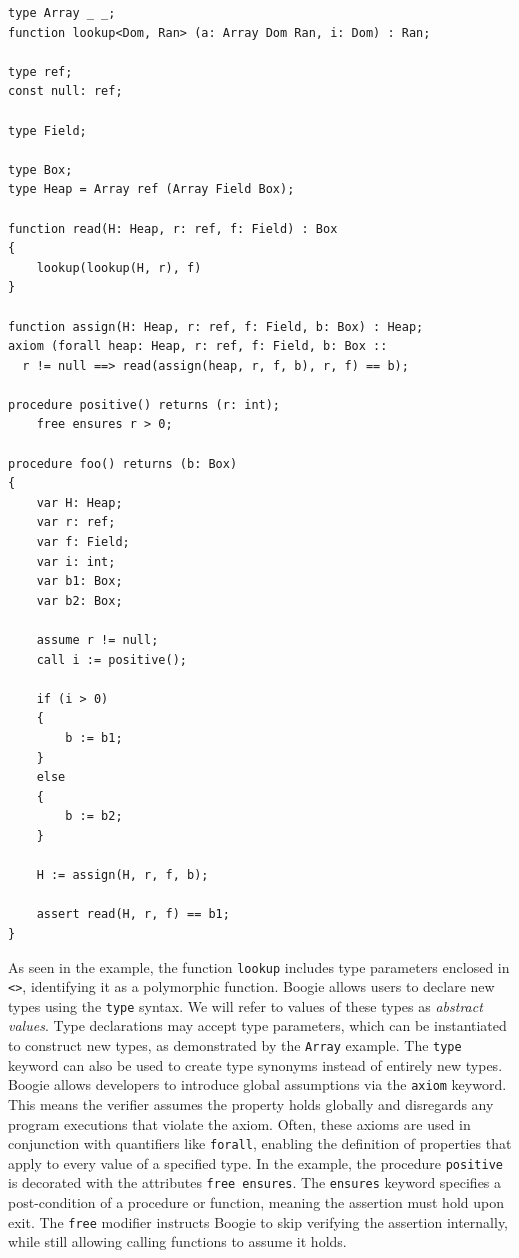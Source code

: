 \begin{lstlisting}[caption={Example Boogie code (inspired by Dafny's encoding)}]
type Array _ _;
function lookup<Dom, Ran> (a: Array Dom Ran, i: Dom) : Ran;

type ref;
const null: ref;

type Field;

type Box;
type Heap = Array ref (Array Field Box);

function read(H: Heap, r: ref, f: Field) : Box
{
    lookup(lookup(H, r), f)
}

function assign(H: Heap, r: ref, f: Field, b: Box) : Heap;
axiom (forall heap: Heap, r: ref, f: Field, b: Box ::
  r != null ==> read(assign(heap, r, f, b), r, f) == b);

procedure positive() returns (r: int);
    free ensures r > 0;

procedure foo() returns (b: Box)
{
    var H: Heap;
    var r: ref;
    var f: Field;
    var i: int;
    var b1: Box;
    var b2: Box;

    assume r != null;
    call i := positive();

    if (i > 0)
    {
        b := b1;
    }
    else
    {
        b := b2;
    }

    H := assign(H, r, f, b);

    assert read(H, r, f) == b1;
}
\end{lstlisting}

As seen in the example, the function \lstinline[columns=fixed]{lookup} includes type parameters enclosed in \lstinline[columns=fixed]{<>},
identifying it as a polymorphic function.
Boogie allows users to declare new types using the \lstinline[columns=fixed]{type} syntax.
We will refer to values of these types as \emph{abstract values}.
Type declarations may accept type parameters,
which can be instantiated to construct new types, as demonstrated by the \lstinline[columns=fixed]{Array} example.
The \lstinline[columns=fixed]{type} keyword can also be used to create type synonyms instead of entirely new types.
Boogie allows developers to introduce global assumptions via the \lstinline[columns=fixed]{axiom} keyword.
This means the verifier assumes the property holds globally and disregards any program executions that violate the axiom.
Often, these axioms are used in conjunction with quantifiers like \lstinline[columns=fixed]{forall}, 
enabling the definition of properties that apply to every value of a specified type.
In the example, the procedure \lstinline[columns=fixed]{positive} is decorated with the attributes \lstinline[columns=fixed]{free ensures}.
The \lstinline[columns=fixed]{ensures} keyword specifies a post-condition of a procedure or function, 
meaning the assertion must hold upon exit.
The \lstinline[columns=fixed]{free} modifier instructs Boogie to skip verifying the assertion internally,
while still allowing calling functions to assume it holds.


